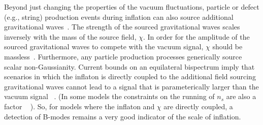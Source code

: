 Beyond just changing the properties of the vacuum fluctuations, particle or defect (e.g., string) production events during inflation can also source additional gravitational waves~\cite{Cook:2011hg,Senatore:2011sp}. The strength of the sourced gravitational waves scales inversely with the mass of the source field, $\chi$. In order for the amplitude of the sourced gravitational waves to compete with the vacuum signal, $\chi$ should be massless~\cite{Barnaby:2012xt}. Furthermore, any particle production processes generically source scalar non-Gaussianity. Current bounds on an equilateral bispectrum imply that scenarios in which the inflaton is directly coupled to the additional field sourcing gravitational waves cannot lead to a signal that is parameterically larger than the vacuum signal ~\cite{Barnaby:2012xt,Ferreira:2014zia,Mirbabayi:2014jqa,Ozsoy:2014sba}. (In some models the constraints on the running of $n_s$ are also a factor ~\cite{Meerburg:2012id} ). So, for models where the inflaton and $\chi$ are directly coupled, a detection of B-modes remains a very good indicator of the scale of inflation. 



